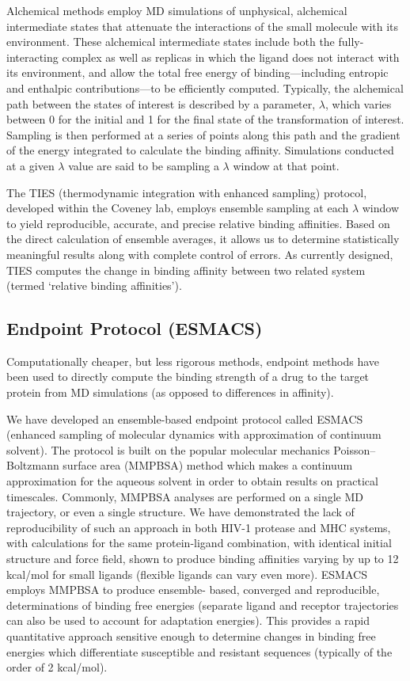 \documentclass[conference]{IEEEtran}
\begin{document}
Alchemical methods employ MD simulations of unphysical, alchemical intermediate states that attenuate the interactions of the small molecule with its environment. 
These alchemical intermediate states include both the fully-interacting complex as well as replicas in which the ligand does not interact with its environment, and allow the total free energy of binding—including entropic and enthalpic contributions—to be efficiently computed. Typically, the alchemical path between the states of interest is described by a parameter, $\lambda$, which varies between 0 for the initial and 1 for the final state of the transformation of interest. 
Sampling is then performed at a series of points along this path and the gradient of the energy integrated to calculate the binding affinity.
Simulations conducted at a given $\lambda$ value are said to be sampling a $\lambda$ window at that point.

The TIES (thermodynamic integration with enhanced sampling) protocol, developed within the Coveney lab, employs ensemble sampling at each $\lambda$ window to yield reproducible, accurate, and precise relative binding affinities. 
\cite{ Wan2017brd4} Based on the direct calculation of ensemble averages, it allows us to determine statistically meaningful results along with complete control of errors. 
As currently designed, TIES computes the change in binding affinity between two related system (termed ‘relative binding affinities’).


\subsection{Endpoint Protocol (ESMACS)}\label{sec:esmacs}

Computationally cheaper, but less rigorous methods, endpoint methods have been used to directly compute the binding strength of a drug to the target protein from MD simulations (as opposed to differences in affinity). 

We have developed an ensemble-based endpoint protocol called ESMACS (enhanced sampling of molecular dynamics with approximation of continuum solvent). The protocol is built on the popular molecular mechanics Poisson–Boltzmann surface area (MMPBSA) \cite{Massova1999} method which makes a continuum approximation for the aqueous solvent in order to obtain results on practical timescales. Commonly, MMPBSA analyses are performed on a single MD trajectory, or even a single structure. We have demonstrated the lack of reproducibility of such an approach in both HIV-1 protease and MHC systems, with calculations for the same protein-ligand combination, with identical initial structure and force field, shown to produce binding affinities varying by up to 12 kcal/mol for small ligands (flexible ligands can vary even more). \cite{Wan2015} ESMACS employs MMPBSA to produce ensemble- based, converged and reproducible, determinations of binding free energies (separate ligand and receptor trajectories can also be used to account for adaptation energies). This provides a rapid quantitative approach sensitive enough to determine changes in binding free energies which differentiate susceptible and resistant sequences (typically of the order of 2 kcal/mol).
\end{document}
